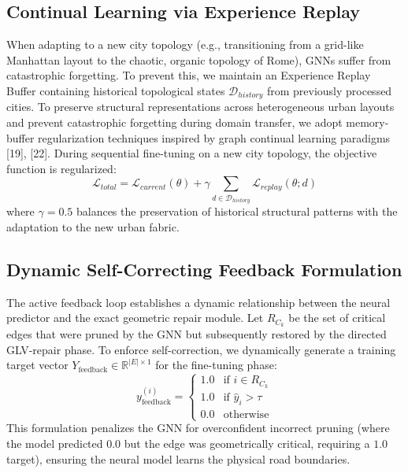 \documentclass[journal]{IEEEtran}
\begin{document}
\subsection{Continual Learning via Experience Replay}
When adapting to a new city topology (e.g., transitioning from a grid-like Manhattan layout to the chaotic, organic topology of Rome), GNNs suffer from catastrophic forgetting. To prevent this, we maintain an Experience Replay Buffer containing historical topological states $\mathcal{D}_{history}$ from previously processed cities. To preserve structural representations across heterogeneous urban layouts and prevent catastrophic forgetting during domain transfer, we adopt memory-buffer regularization techniques inspired by graph continual learning paradigms [19], [22]. During sequential fine-tuning on a new city topology, the objective function is regularized:
\begin{equation}
    \mathcal{L}_{total} = \mathcal{L}_{current}(\theta) + \gamma \sum_{d \in \mathcal{D}_{history}} \mathcal{L}_{replay}(\theta; d)
\end{equation}
where $\gamma = 0.5$ balances the preservation of historical structural patterns with the adaptation to the new urban fabric.

\subsection{Dynamic Self-Correcting Feedback Formulation}
The active feedback loop establishes a dynamic relationship between the neural predictor and the exact geometric repair module. Let $R_{C_k}$ be the set of critical edges that were pruned by the GNN but subsequently restored by the directed GLV-repair phase. To enforce self-correction, we dynamically generate a training target vector $Y_{\text{feedback}} \in \mathbb{R}^{|E| \times 1}$ for the fine-tuning phase:
\begin{equation}
    y_{\text{feedback}}^{(i)} = 
    \begin{cases} 
      1.0 & \text{if } i \in R_{C_k} \\
      1.0 & \text{if } \hat{y}_i > \tau \\
      0.0 & \text{otherwise}
    \end{cases}
\end{equation}
This formulation penalizes the GNN for overconfident incorrect pruning (where the model predicted $0.0$ but the edge was geometrically critical, requiring a $1.0$ target), ensuring the neural model learns the physical road boundaries.
\end{document}
